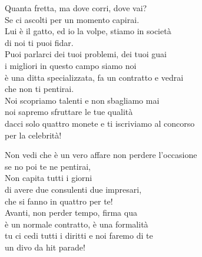 \documentclass[10pt, twoside, a4paper]{article}
\begin{document}
\begin{multicols}{2}

Quanta fretta, ma dove corri, dove vai? \\
Se ci ascolti per un momento capirai. \\
Lui è il gatto, ed io la volpe, stiamo in società \\
di noi ti puoi fidar. \hspace{32pt}\hspace{16pt} \\

Puoi parlarci dei tuoi problemi, dei tuoi guai \\
i migliori in questo campo siamo noi \\
è una ditta specializzata, fa un contratto e vedrai \\
che non ti pentirai. \\

Noi scopriamo talenti e non sbagliamo mai \\
noi sapremo sfruttare le tue qualità \\
dacci solo quattro monete e ti iscriviamo al concorso \\
per la celebrità! \\

\columnbreak

Non vedi che è un vero affare non perdere l'occasione \\
se no poi te ne pentirai, \\
Non capita tutti i giorni \\
di avere due consulenti due impresari, \\
che si fanno in quattro per te! \\

Avanti, non perder tempo, firma qua \\
è un normale contratto, è una formalità \\
tu ci cedi tutti i diritti e noi faremo di te \\
un divo da hit parade! \\


\end{multicols}
\end{document}
